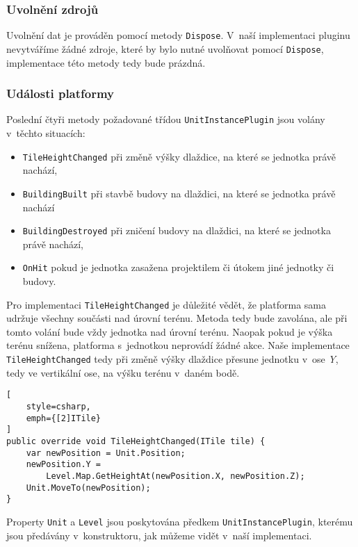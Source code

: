 \subsubsection{Uvolnění zdrojů}

Uvolnění dat je prováděn pomocí metody \texttt{Dispose}. V~naší implementaci pluginu nevytváříme žádné zdroje, které by bylo nutné uvolňovat pomocí \texttt{Dispose}, implementace této metody tedy bude prázdná.


\subsubsection{Události platformy}

Poslední čtyři metody požadované třídou \texttt{UnitInstancePlugin} jsou volány v~těchto situacích:
\begin{itemize}
	\item \texttt{TileHeightChanged} při změně výšky dlaždice, na které se jednotka právě nachází,
	\item \texttt{BuildingBuilt} při stavbě budovy na dlaždici, na které se jednotka právě nachází
	\item \texttt{BuildingDestroyed} při zničení budovy na dlaždici, na které se jednotka právě nachází,
	\item \texttt{OnHit} pokud je jednotka zasažena projektilem či útokem jiné jednotky či budovy.
\end{itemize}


Pro implementaci \texttt{TileHeightChanged} je důležité vědět, že platforma sama udržuje všechny součásti nad úrovní terénu. Metoda tedy bude zavolána, ale při tomto volání bude vždy jednotka nad úrovní terénu. Naopak pokud je výška terénu snížena, platforma s~jednotkou neprovádí žádné akce. Naše implementace \texttt{TileHeightChanged} tedy při změně výšky dlaždice přesune jednotku v~ose \textit{Y}, tedy ve vertikální ose, na výšku terénu v~daném bodě.


\begin{lstlisting}[
	style=csharp,
	emph={[2]ITile}
]
public override void TileHeightChanged(ITile tile) {
	var newPosition = Unit.Position;
	newPosition.Y = 
		Level.Map.GetHeightAt(newPosition.X, newPosition.Z);
	Unit.MoveTo(newPosition);
}
\end{lstlisting}

Property \texttt{Unit} a \texttt{Level} jsou poskytována předkem \texttt{UnitInstancePlugin}, kterému jsou předávány v~konstruktoru, jak můžeme vidět v~naší implementaci.


